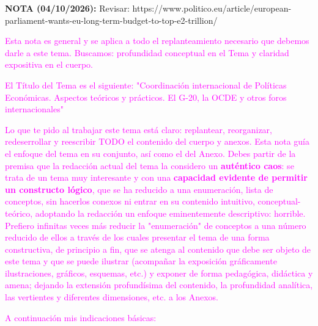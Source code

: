 \documentclass[10pt,a4paper]{article}
\newcommand{\modificaciones}[1]{
  \begin{tcolorbox}[
    colback=white,
    colframe=red,
    title={Modificaciones a realizar},
    before upper={\setlength{\parindent}{0.5cm}\setlength{\parskip}{0.5\baselineskip}}
  ]
  #1
  \end{tcolorbox}
}
\newcounter{anexo}
\begin{document}
\modificaciones{
    \textbf{NOTA (04/10/2026):} Revisar: https://www.politico.eu/article/european-parliament-wants-eu-long-term-budget-to-top-e2-trillion/

    \textcolor{magenta}{Esta nota es general y se aplica a todo el replanteamiento necesario que debemos darle a este tema. Buscamos: profundidad conceptual en el Tema y claridad expositiva en el cuerpo.

    El Título del Tema es el siguiente: "Coordinación internacional de Políticas Económicas. Aspectos teóricos y prácticos. El G-20, la OCDE y otros foros internacionales"

    Lo que te pido al trabajar este tema está claro: replantear, reorganizar, redeserrollar y reescribir TODO el contenido del cuerpo y anexos. Esta nota guía el enfoque del tema en su conjunto, así como el del Anexo. Debes partir de la premisa que la redacción actual del tema la considero un \textbf{auténtico caos}: se trata de un tema muy interesante y con una \textbf{capacidad evidente de permitir un constructo lógico}, que se ha reducido a una enumeración, lista de conceptos, sin hacerlos conexos ni entrar en su contenido intuitivo, conceptual-teórico, adoptando la redacción un enfoque eminentemente descriptivo: horrible. Prefiero infinitas veces más reducir la "enumeración" de conceptos a una número reducido de ellos a través de los cuales presentar el tema de una forma constructiva, de principio a fin, que se atenga al contenido que debe ser objeto de este tema y que se puede ilustrar (acompañar la exposición gráficamente ilustraciones, gráficos, esquemas, etc.) y exponer de forma pedagógica, didáctica y amena; dejando la extensión profundísima del contenido, la profundidad analítica, las vertientes y diferentes dimensiones, etc. a los Anexos.
    
    A continuación mis indicaciones básicas:
    
}}
\end{document}
